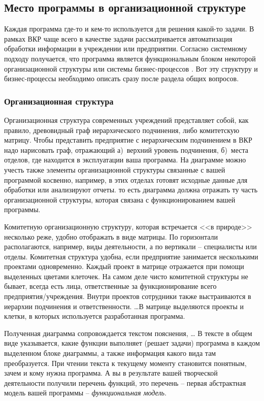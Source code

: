 \documentclass[a4paper,14pt,final]{extreport}
\begin{document}
\subsection{Место программы в организационной структуре}
\label{sec:designation}

Каждая программа где-то и кем-то используется для решения какой-то задачи.  В рамках ВКР чаще всего в качестве задачи рассматривается автоматизация обработки информации в учреждении или предприятии.  Согласно системному подходу \cite{sysap} получается, что программа является функциональным блоком некоторой организационной структуры или системы бизнес-процессов \cite{BP}.  Вот эту структуру и бизнес-процессы необходимо описать сразу после раздела общих вопросов.

\subsubsection{Организационная структура}
\label{sec:orgstruct}

Организационная структура современных учреждений представляет собой, как правило, древовидный граф иерархического подчинения, либо комитетскую матрицу.  Чтобы представить предприятие с иерархическим подчинением в ВКР надо нарисовать граф, отражающий а)~верхний уровень подчинения, б)~места отделов, где находится в эксплуатации ваша программа.  На диаграмме можно учесть также элементы организационной структуры связанные с вашей программой косвенно, например, в этих отделах готовят исходные данные для обработки или анализируют отчеты.  то есть диаграмма должна отражать ту часть организационной структуры, которая связана с функционированием вашей программы.

Комитетную организационную структуру, которая встречается <<в природе>> несколько реже, удобно отображать в виде матрицы.  По горизонтали располагаются, например, виды деятельности, а по вертикали -- специалисты или отделы.  Комитетная структура удобна, если предприятие занимается несколькими проектами одновременно.  Каждый проект в матрице отражается при помощи выделенных цветами клеточек.  На самом деле чисто комитетной структуры не бывает, всегда есть лица, ответственные за функционирование всего предприятия/учреждения.  Внутри проектов сотрудники также выстраиваются в иерархии подчинения и ответственности.  \ldots{}В матрице выделяются проекты и клетки, в которых используется разработанная программа.

Полученная диаграмма сопровождается текстом пояснения, \ldots{}  В тексте в общем виде указывается, какие функции выполняет (решает задачи) программа в каждом выделенном блоке диаграммы, а также информация какого вида там преобразуется.  При чтении текста к текущему моменту становится понятным, зачем и кому нужна программа.  А вы в результате вашей творческой деятельности получили перечень функций, это перечень -- первая абстрактная модель вашей программы -- \emph{функциональная модель}.
\end{document}
